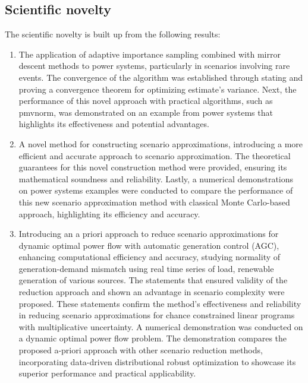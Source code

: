 \subsection*{Scientific novelty}
The scientific novelty is built up from the following results:
\begin{enumerate}
    \item The application of adaptive importance sampling combined with mirror descent methods to power systems, particularly in scenarios involving rare events. The convergence of the algorithm was established through stating and proving a convergence theorem for optimizing estimate's variance. Next, the performance of this novel approach with practical algorithms, such as pmvnorm, was demonstrated on an example from power systems that highlights its effectiveness and potential advantages.
    \item A novel method for constructing scenario approximations, introducing a more efficient and accurate approach to scenario approximation. The theoretical guarantees for this novel construction method were provided, ensuring its mathematical soundness and reliability. Lastly, a numerical demonstrations on power systems examples were conducted to compare the performance of this new scenario approximation method with classical Monte Carlo-based approach, highlighting its efficiency and accuracy.
    \item Introducing an a priori approach to reduce scenario approximations for dynamic optimal power flow with automatic generation control (AGC), enhancing computational efficiency and accuracy, studying normality of generation-demand mismatch using real time series of load, renewable generation of various sources. The statements that ensured validity of the reduction approach and shown an advantage in scenario complexity were proposed. These statements confirm the method's effectiveness and reliability in reducing scenario approximations for chance constrained linear programs with multiplicative uncertainty. A numerical demonstration was conducted on a dynamic optimal power flow problem. The demonstration compares the proposed a-priori approach with other scenario reduction methods, incorporating data-driven distributional robust optimization to showcase its superior performance and practical applicability.
\end{enumerate}

